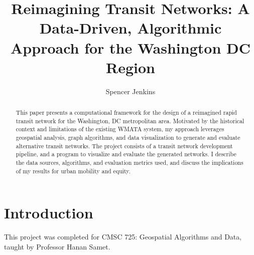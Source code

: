 \documentclass[manuscript,nonacm]{acmart}
\begin{document}
\title{Reimagining Transit Networks: A Data-Driven, Algorithmic Approach for the Washington DC Region}

\author{Spencer Jenkins}


\renewcommand{\shortauthors}{Trovato et al.}

\begin{abstract}
This paper presents a computational framework for the design of a reimagined rapid transit network for the Washington, DC metropolitan area. Motivated by the historical context and limitations of the existing WMATA system, my approach leverages geospatial analysis, graph algorithms, and data visualization to generate and evaluate alternative transit networks. The project consists of a transit network development pipeline, and a program to visualize and evaluate the generated networks. I describe the data sources, algorithms, and evaluation metrics used, and discuss the implications of my results for urban mobility and equity.
\end{abstract}

\maketitle



\section{Introduction}

This project was completed for CMSC 725: Geospatial Algorithms and Data, taught by Professor Hanan Samet. 
\end{document}
